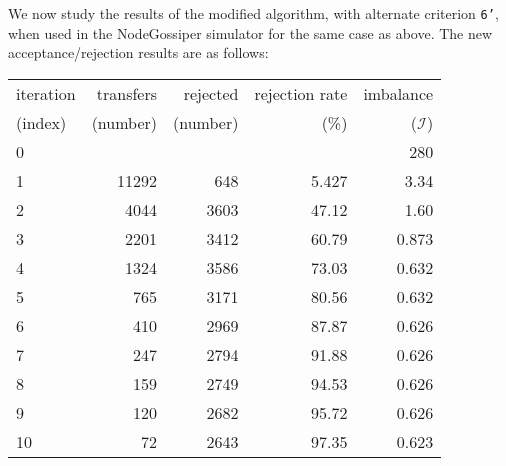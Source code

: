We now study the results of the modified algorithm, with alternate
criterion \texttt{6'}, when used in the \textsf{NodeGossiper}
simulator for the same case as above.
The new acceptance/rejection results are as follows:
\begin{center}
\begin{tabular}{@{}lrrrr@{}}
\hline
iteration & transfers & rejected & rejection rate & imbalance\\
(index)   & (number)  & (number) & (\%) & ($\mathcal{I}$)\\
\hline\hline
 0 &       &      &       &   280\\
 1 & 11292 &  648 & 5.427 &  3.34\\
 2 &  4044 & 3603 & 47.12 &  1.60\\
 3 &  2201 & 3412 & 60.79 & 0.873\\
 4 &  1324 & 3586 & 73.03 & 0.632\\
 5 &   765 & 3171 & 80.56 & 0.632\\
 6 &   410 & 2969 & 87.87 & 0.626\\
 7 &   247 & 2794 & 91.88 & 0.626\\
 8 &   159 & 2749 & 94.53 & 0.626\\
 9 &   120 & 2682 & 95.72 & 0.626\\
10 &    72 & 2643 & 97.35 & 0.623\\
\hline
\end{tabular}
\end{center}

